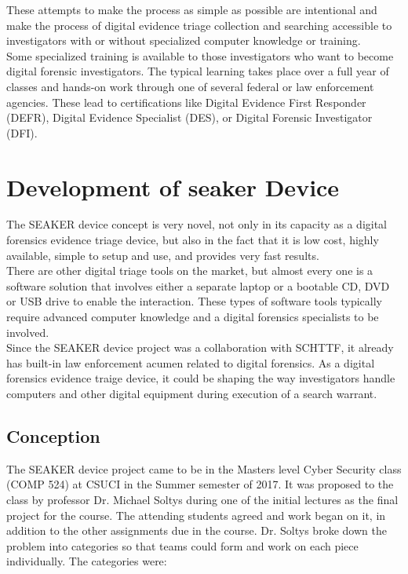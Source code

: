 \documentclass[12pt]{article}
\begin{document}
These attempts to make the process as simple as possible are intentional and 
make the process of digital evidence triage collection and searching accessible
to investigators with or without specialized computer knowledge or training.\\

Some specialized training is available to those investigators who want to 
become digital forensic investigators.  The typical learning takes place over
a full year of classes and hands-on work through one of several federal or 
law enforcement agencies.  These lead to certifications like Digital Evidence
First Responder (DEFR), Digital Evidence Specialist (DES), or Digital Forensic
Investigator (DFI).\\

\section{Development of \gls{seaker} Device}
\label{sect-developmentSeakerDevice}

The SEAKER device concept is very novel, not only in its capacity as a digital 
forensics evidence triage device, but also in the fact that it is low cost, highly
available, simple to setup and use, and provides very fast results.\\

There are other digital triage tools on the market, but almost every one is a
software solution that involves either a separate laptop or a bootable
CD, DVD or USB drive to enable the interaction.  These types of software tools
typically require advanced computer knowledge and a digital forensics specialists
to be involved.\\

Since the SEAKER device project was a collaboration with SCHTTF, it already has
built-in law enforcement acumen related to digital forensics.  As a digital
forensics evidence traige device, it could be shaping the way investigators
handle computers and other digital equipment during execution of a search warrant.\\

\subsection{Conception}

The SEAKER device project came to be in the Masters level Cyber Security class (COMP 524)
at CSUCI in the Summer semester of 2017.  It was proposed to the class by professor 
Dr. Michael Soltys during one of the initial lectures as the final project for the
course.  The attending students agreed and work began on it, in addition to the other
assignments due in the course.  Dr. Soltys broke down the problem into categories so
that teams could form and work on each piece individually.  The categories were:
\end{document}

